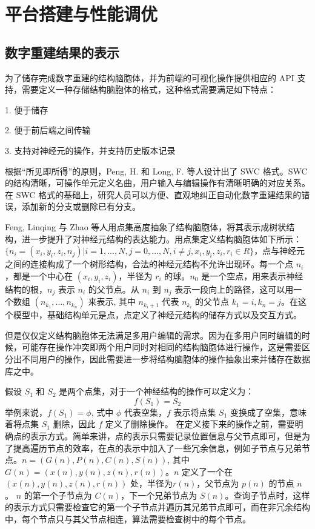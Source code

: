 \chapter{平台搭建与性能调优}
\label{chap3}

\section{数字重建结果的表示}
为了储存完成数字重建的结构脑胞体，并为前端的可视化操作提供相应的 API 支持，需要定义一种存储结构脑胞体的格式，这种格式需要满足如下特点：

1. 便于储存

2. 便于前后端之间传输

3. 支持对神经元的操作，并支持历史版本记录

根据“所见即所得”的原则，Peng, H. 和 Long, F. 等人设计出了 SWC 格式。SWC 的结构清晰，可操作单元定义名曲，用户输入与编辑操作有清晰明确的对应关系。在 SWC 格式的基础上，研究人员可以方便、直观地纠正自动化数字重建结果的错误，添加新的分支或删除已有分支。

Feng, Linqing 与 Zhao 等人用点集高度抽象了结构脑胞体，将其表示成树状结构，进一步提升了对神经元结构的表达能力。用点集定义结构脑胞体如下所示：$\{ n_i = (x_i, y_i, z_i, n_j) | i = 1,..., N, j = 0,..., N, i \neq j, x_i, y_i, z_i, r_i \in R \}$，点与神经元之间的连接构成了一个树形结构，合法的神经元结构不允许出现环。每一个点 $n_i$，都是一个中心在 $(x_i, y_i, z_i)$，半径为 $r_i$ 的球。$n_0$ 是一个空点，用来表示神经结构的根，$n_j$ 表示 $n_i$ 的父节点。从 $n_i$ 到 $n_j$ 表示一段向上的路径，这可以用一个数组 $(n_{k_1},...,n_{k_n})$ 来表示, 其中 $n_{k_i+1}$ 代表 $n_{k_i}$ 的父节点 $k_1 = i, k_n = j$。在这个模型中，基础结构单元是点，点定义了神经元结构的储存方式以及交互方式。

但是仅仅定义结构脑胞体无法满足多用户编辑的需求。因为在多用户同时编辑的时候，可能存在操作冲突即两个用户同时对相同的结构脑胞体进行操作，这是需要区分出不同用户的操作，因此需要进一步将结构脑胞体的操作抽象出来并储存在数据库之中。

假设 $S_1$ 和 $S_2$ 是两个点集，对于一个神经结构的操作可以定义为：
$$f(S_1) = S_2$$
举例来说，$f(S_1)= \phi$, 式中 $\phi$ 代表空集，$f$ 表示将点集 $S_1$ 变换成了空集，意味着将点集 $S_1$ 删除，因此 $f$ 定义了删除操作。
在定义接下来的操作之前，需要明确点的表示方式。简单来讲，点的表示只需要记录位置信息与父节点即可，但是为了提高遍历节点的效率，在点的表示中加入了一些冗余信息，例如子节点与兄弟节点。$n=(G(n), P(n), C(n), S(n))$, 其中 $G(n) = (x(n), y(n), z(n), r(n))$。$n$ 定义了一个在$(x(n), y(n), z(n), r(n))$ 处，半径为$r(n)$，父节点为 $p(n)$ 的节点 $n$。 $n$ 的第一个子节点为 $C(n)$，下一个兄弟节点为 $S(n)$。查询子节点时，这样的表示方式只需要检查它的第一个子节点并遍历其兄弟节点即可，而在非冗余结构中，每个节点只与其父节点相连，算法需要检查树中的每个节点。

